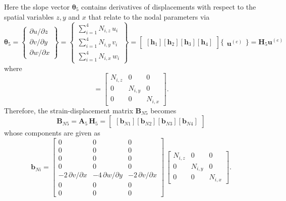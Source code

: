 Here the slope vector $\boldsymbol{\theta}_5$ contains derivatives of displacements with respect to the spatial variables $z, y$ and $x$ that relate to the nodal parameters via
\begin{equation}
	\boldsymbol{\theta}_5 =  \begin{Bmatrix}
		\partial u / \partial z\\
		\partial v / \partial y \\
		\partial w / \partial x
	\end{Bmatrix}
	= \begin{Bmatrix}
		\sum\nolimits_{i=1}^4 N_{i,z} \, u_i\\
		\sum\nolimits_{i=1}^4 N_{i,y} \, v_i \\
		\sum\nolimits_{i=1}^4 N_{i,x} \, w_i
	\end{Bmatrix} 
	= \begin{bmatrix}
		[\mathbf{h}_1] [\mathbf{h}_2] [\mathbf{h}_3] [\mathbf{h}_4] 
	\end{bmatrix} \bigl\{ \begin{matrix} \mathbf{u}^{(e)} \end{matrix} \bigr\}
	= \mathbf{H}_5  \mathbf{u}^{(e)}
\end{equation}
where 
\begin{equation}
	[\mathbf{h}_i] = \begin{bmatrix}
		N_{i,z} &  0 & 0  \\
		0 & N_{i,y} & 0  \\
		0 & 0 & N_{i,x} \end{bmatrix}. 
\end{equation}
Therefore, the strain-displacement matrix $\mathbf{B}_{N5}$ becomes
\begin{equation}
	\mathbf{B}_{N5} = \mathbf{A}_5 \, \mathbf{H}_5 = \begin{bmatrix}
		[\mathbf{b}_{N1}] [\mathbf{b}_{N2}] [\mathbf{b}_{N3}] [\mathbf{b}_{N4}]
	\end{bmatrix} 
\end{equation}
whose components are given as
\begin{equation}
	\mathbf{b}_{Ni} = \begin{bmatrix}
		0 & 0 &  0   \\
		0 &  0 & 0  \\
		0 &  0 & 0 \\
		0 &  0 & 0 \\
		- 2 \, \partial v / \partial x & - 4 \, \partial w / \partial y & - 2 \, \partial v / \partial x  \\
		0 &  0 & 0  \\
		0 &  0 & 0  \end{bmatrix} \, \begin{bmatrix}
		N_{i,z} &  0 & 0  \\
		0 & N_{i,y} & 0  \\
		0 & 0 & N_{i,x}  \end{bmatrix}.
\end{equation}

